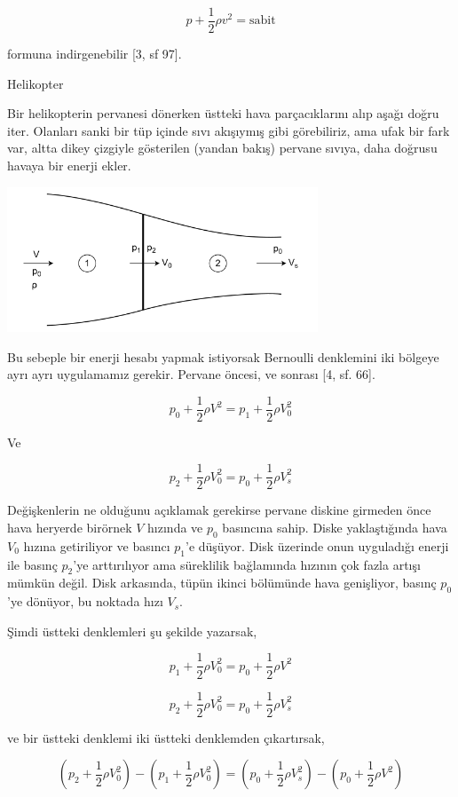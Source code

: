 \documentclass[12pt,fleqn]{article}\usepackage{../../common}
\begin{document}
$$
p + \frac{1}{2} \rho v^2 = \textrm{sabit}
$$

formuna indirgenebilir [3, sf 97]. 

Helikopter

Bir helikopterin pervanesi dönerken üstteki hava parçacıklarını alıp aşağı
doğru iter. Olanları sanki bir tüp içinde sıvı akışıymış gibi görebiliriz,
ama ufak bir fark var, altta dikey çizgiyle gösterilen (yandan bakış)
pervane sıvıya, daha doğrusu havaya bir enerji ekler.

\includegraphics[width=25em]{phy_045_flight_03.png}

Bu sebeple bir enerji hesabı yapmak istiyorsak Bernoulli denklemini iki
bölgeye ayrı ayrı uygulamamız gerekir. Pervane öncesi, ve sonrası [4,
sf. 66].

$$
p_0 + \frac{1}{2} \rho V^2 = p_1 + \frac{1}{2} \rho V_0^2
$$

Ve

$$
p_2 + \frac{1}{2} \rho V_0^2 = p_0 + \frac{1}{2} \rho V_s^2
$$

Değişkenlerin ne olduğunu açıklamak gerekirse pervane diskine girmeden önce
hava heryerde birörnek $V$ hızında ve $p_0$ basıncına sahip. Diske
yaklaştığında hava $V_0$ hızına getiriliyor ve basıncı $p_1$'e
düşüyor. Disk üzerinde onun uyguladığı enerji ile basınç $p_2$'ye
arttırılıyor ama süreklilik bağlamında hızının çok fazla artışı mümkün
değil. Disk arkasında, tüpün ikinci bölümünde hava genişliyor, basınç
$p_0$'ye dönüyor, bu noktada hızı $V_s$.

Şimdi üstteki denklemleri şu şekilde yazarsak, 

$$
p_1 + \frac{1}{2} \rho V_0^2 = p_0 + \frac{1}{2} \rho V^2
$$

$$
p_2 + \frac{1}{2} \rho V_0^2 = p_0 + \frac{1}{2} \rho V_s^2
$$

ve bir üstteki denklemi iki üstteki denklemden çıkartırsak, 

$$
\left(p_2 + \frac{1}{2} \rho V_0^2 \right) - 
\left(p_1 + \frac{1}{2} \rho V_0^2 \right) = 
\left(p_0 + \frac{1}{2} \rho V_s^2 \right) - 
\left(p_0 + \frac{1}{2} \rho V^2 \right)
$$
\end{document}
